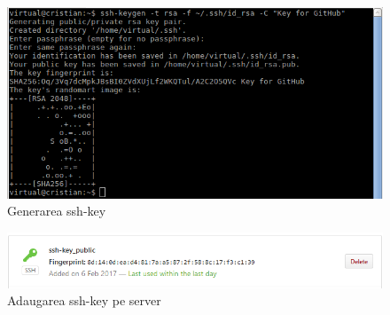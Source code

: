 \begin{figure}[htb]
	\begin{center}
		\centering
		\includegraphics[scale = 0.9]{img/ssh_key.png}
		\caption{Generarea ssh-key}%
		\label{fig:generarea_ssh_key}
	\end{center}
\end{figure}

\begin{figure}[htb]
	\begin{center}
		\centering
		\includegraphics[scale = 0.9]{img/add_key_onserver.png}
		\caption{Adaugarea ssh-key pe server}%
		\label{fig:add_key_onserver}
	\end{center}
\end{figure}

\clearpage